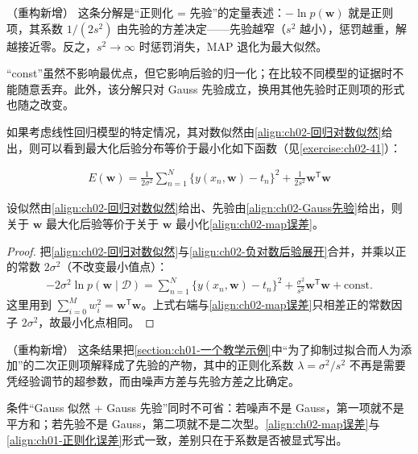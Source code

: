 \documentclass[../../main.tex]{subfiles}
\begin{document}
\begin{remark}（重构新增）
这条分解是“正则化 = 先验”的定量表述：$-\ln p(\mathbf{w})$ 就是正则项，其系数 $1/(2s^{2})$ 由先验的方差决定——先验越窄（$s^{2}$ 越小），惩罚越重，解越接近零。反之，$s^{2}\to\infty$ 时惩罚消失，MAP 退化为最大似然。

“const”虽然不影响最优点，但它影响后验的归一化；在比较不同模型的证据时不能随意丢弃。此外，该分解只对 Gauss 先验成立，换用其他先验时正则项的形式也随之改变。
\end{remark}

如果考虑线性回归模型的特定情况，其对数似然由\eqref{align:ch02-回归对数似然}给出，则可以看到最大化后验分布等价于最小化如下函数（见\cref{exercise:ch02-41}）：

\begin{align}
  E(\mathbf{w}) = \frac{1}{2\sigma^{2}}\sum_{n=1}^{N}\big\{y(x_n,\mathbf{w})-t_n\big\}^{2} + \frac{1}{2s^{2}}\mathbf{w}^{\mathsf{T}}\mathbf{w}
  \label{align:ch02-map误差}
\end{align}

\begin{proposition}\label{proposition:ch02-map正则化}
设似然由\eqref{align:ch02-回归对数似然}给出、先验由\eqref{align:ch02-Gauss先验}给出，则关于 $\mathbf{w}$ 最大化后验等价于关于 $\mathbf{w}$ 最小化\eqref{align:ch02-map误差}。
\end{proposition}

\begin{proof}
把\eqref{align:ch02-回归对数似然}与\eqref{align:ch02-负对数后验展开}合并，并乘以正的常数 $2\sigma^{2}$（不改变最小值点）：
\begin{align*}
  -2\sigma^{2}\ln p(\mathbf{w}\mid\mathcal{D})
  = \sum_{n=1}^{N}\big\{y(x_n,\mathbf{w})-t_n\big\}^{2} + \frac{\sigma^{2}}{s^{2}}\mathbf{w}^{\mathsf{T}}\mathbf{w} + \text{const} .
\end{align*}
这里用到 $\sum_{i=0}^{M}w_i^{2}=\mathbf{w}^{\mathsf{T}}\mathbf{w}$。上式右端与\eqref{align:ch02-map误差}只相差正的常数因子 $2\sigma^{2}$，故最小化点相同。
\end{proof}

\begin{remark}（重构新增）
这条结果把\cref{section:ch01-一个教学示例}中“为了抑制过拟合而人为添加”的二次正则项解释成了先验的产物，其中的正则化系数 $\lambda=\sigma^{2}/s^{2}$ 不再是需要凭经验调节的超参数，而由噪声方差与先验方差之比确定。

条件“Gauss 似然 + Gauss 先验”同时不可省：若噪声不是 Gauss，第一项就不是平方和；若先验不是 Gauss，第二项就不是二次型。\eqref{align:ch02-map误差}与\eqref{align:ch01-正则化误差}形式一致，差别只在于系数是否被显式写出。
\end{remark}
\end{document}
